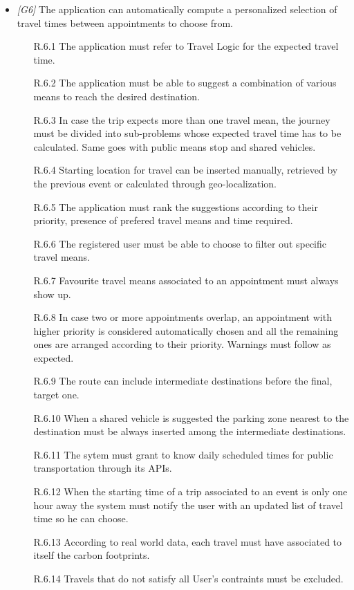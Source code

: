 \begin{itemize}
	\item \textit{[G6]} The application can automatically compute a personalized selection of travel times between appointments to choose from.
		\begin{itemize}
			\item [R.6.1] The application must refer to Travel Logic for the expected travel time.
			\item [R.6.2] The application must be able to suggest a combination of various means to reach the desired destination.
			\item [R.6.3] In case the trip expects more than one travel mean, the journey must be divided into sub-problems whose expected travel time has to be calculated. Same goes with public means stop and shared vehicles.
			\item [R.6.4] Starting location for travel can be inserted manually, retrieved by the previous event or calculated through geo-localization.
			\item [R.6.5] The application must rank the suggestions according to their priority, presence of prefered travel means and time required.
			\item [R.6.6] The registered user must be able to choose to filter out specific travel means.
			\item [R.6.7] Favourite travel means associated to an appointment must always show up.
			\item [R.6.8] In case two or more appointments overlap, an appointment with higher priority is considered automatically chosen and all the remaining ones are arranged according to their priority. Warnings must follow as expected.
			\item [R.6.9] The route can include intermediate destinations before the final, target one.
			\item [R.6.10] When a shared vehicle is suggested the parking zone nearest to the destination must be always inserted among the intermediate destinations.
			\item [R.6.11] The sytem must grant to know daily scheduled times for public transportation through its APIs.
			\item [R.6.12] When the starting time of a trip associated to an event is only one hour away the system must notify the user with an updated list of travel time so he can choose.
			\item [R.6.13] According to real world data, each travel must have associated to itself the carbon footprints.
			\item [R.6.14] Travels that do not satisfy all User's contraints must be excluded.
		\end{itemize}
                  

\end{itemize}
